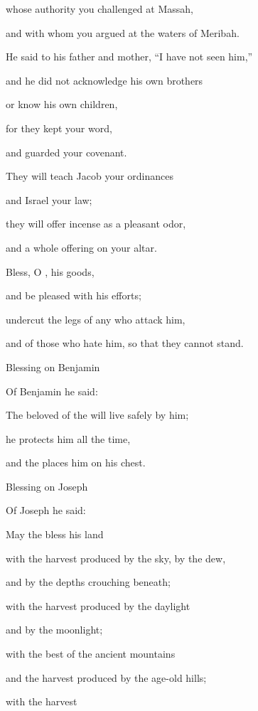 {\par }{\Q whose
authority you challenged
at Massah,
\par }{\Q and with
whom you argued
at the waters
of Meribah.
\par }{\Q {}He said
to his father
and mother,
“I have not
seen
him,”
\par }{\Q and he did not
acknowledge
his own brothers
\par }{\Q or
know
his own children,
\par }{\Q for
they kept
your word,
\par }{\Q and guarded
your covenant.
\par }{\Q {}They will teach
Jacob
your ordinances
\par }{\Q and Israel
your law;
\par }{\Q they will offer
incense
as a pleasant odor,
\par }{\Q and a whole offering
on
your altar.
\par }{\Q {}Bless,
O
{}, his
goods,
\par }{\Q and be pleased with
his efforts;
\par }{\Q undercut
the legs of any who attack
him,
\par }{\Q and of those who hate
him, so that they cannot stand.
\par }{\SH Blessing on Benjamin
\par }{\Q {}Of Benjamin
he said:
\par }{\Q The beloved
of the {}
will live
safely
by him;
\par }{\Q he protects
him all
the time,
\par }{\Q and the
{} places
him on his chest.
\par }{\SH Blessing on Joseph
\par }{\Q {}Of Joseph
he said:
\par }{\Q May the
{}
bless
his land
\par }{\Q with the harvest produced
by the sky,
by the dew,
\par }{\Q and by the depths
crouching
beneath;
\par }{\Q {}with the harvest
produced
by the daylight
\par }{\Q and by the moonlight;
\par }{\Q {}with the best
of the ancient
mountains
\par }{\Q and the harvest produced
by the age-old
hills;
\par }{\Q {}with the harvest
}
